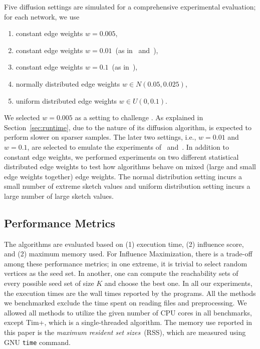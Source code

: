 \documentclass[review]{elsarticle}
\newcommand\acro{{\sc{HyperFuseR\xspace}\xspace}\xspace}
\begin{document}
Five diffusion settings are simulated for a comprehensive experimental evaluation; for each network, we use 
\begin{enumerate}
  \setlength{\itemsep}{0.2pt}
  \setlength{\parskip}{0pt}
  \setlength{\parsep}{0pt}
    \item constant edge weights $w = 0.005$,
    \item constant edge weights $w = 0.01$~(as in~\cite{kempe2003maximizing} and~\cite{MixGreedy}),
    \item constant edge weights $w = 0.1$~(as in~\cite{kempe2003maximizing}),
    \item normally distributed edge weights $w \in N(0.05,0.025)$,
    \item uniform distributed edge weights $w \in U(0,0.1)$.
\end{enumerate}

\noindent We selected $w=0.005$ as a setting to challenge \acro. As explained in Section~\ref{sec:runtime}, due to the nature of its diffusion algorithm, \acro is expected to perform slower on sparser samples. The later two settings, i.e., $w = 0.01$  and $w = 0.1$, are selected to emulate the experiments of~\cite{kempe2003maximizing} and~\cite{MixGreedy}. In addition to constant edge weights, we performed experiments on two different statistical distributed edge weights to test how algorithms behave on mixed (large and small edge weights together) edge weights. The normal distribution setting incurs a small number of extreme sketch values and uniform distribution setting incurs a large number of large sketch values.

\subsection{Performance Metrics}

The algorithms are evaluated based on (1) execution time, (2) influence score, and (2) maximum memory used. For Influence Maximization, there is a trade-off among these performance metrics; in one extreme, it is trivial to select random vertices as the seed set. In another, one can compute the reachability sets of every possible seed set of size $K$ and choose the best one. 
In all our experiments, the execution times are the wall times reported by the programs. All the methods we benchmarked exclude the time spent on reading files and preprocessing. %
We allowed all methods to utilize the given number of CPU cores in all benchmarks, except {\sc Tim+}, which is a single-threaded algorithm. The memory use reported in this paper is the {\em maximum resident set sizes}~(RSS), which are measured using GNU {\tt time} command.
\end{document}
